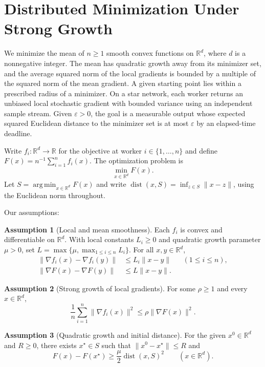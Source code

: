 \documentclass[10pt]{article}
\theoremstyle{definition}
\newtheorem{assumption}{Assumption}
\begin{document}
\section*{Distributed Minimization Under Strong Growth}
We minimize the mean of $n\geq 1$ smooth convex functions on $\mathbb{R}^d$, where $d$ is a nonnegative integer. The mean has quadratic growth away from its minimizer set, and the average squared norm of the local gradients is bounded by a multiple of the squared norm of the mean gradient. A given starting point lies within a prescribed radius of a minimizer. On a star network, each worker returns an unbiased local stochastic gradient with bounded variance using an independent sample stream. Given $\varepsilon>0$, the goal is a measurable output whose expected squared Euclidean distance to the minimizer set is at most $\varepsilon$ by an elapsed-time deadline.

Write $f_i:\mathbb{R}^d\to\mathbb{R}$ for the objective at worker $i\in\{1,\ldots,n\}$ and define $F(x)=n^{-1}\sum_{i=1}^n f_i(x)$. The optimization problem is
\[
\min_{x\in\mathbb{R}^d} F(x).
\]
Let $S=\operatorname*{arg\,min}_{x\in\mathbb{R}^d}F(x)$ and write $\operatorname{dist}(x,S)=\inf_{z\in S}\|x-z\|$, using the Euclidean norm throughout.

Our assumptions:
\begin{assumption}[Local and mean smoothness]
Each $f_i$ is convex and differentiable on $\mathbb{R}^d$. With local constants $L_i\geq 0$ and quadratic growth parameter $\mu>0$, set $L=\max\{\mu,\max_{1\leq i\leq n}L_i\}$. For all $x,y\in\mathbb{R}^d$,
\[
\begin{aligned}
\|\nabla f_i(x)-\nabla f_i(y)\| &\leq L_i\|x-y\| &&(1\leq i\leq n),\\
\|\nabla F(x)-\nabla F(y)\| &\leq L\|x-y\|.
\end{aligned}
\]
\end{assumption}

\begin{assumption}[Strong growth of local gradients]
For some $\rho\geq 1$ and every $x\in\mathbb{R}^d$,
\[
\frac{1}{n}\sum_{i=1}^n\|\nabla f_i(x)\|^2\leq \rho\|\nabla F(x)\|^2.
\]
\end{assumption}

\begin{assumption}[Quadratic growth and initial distance]
For the given $x^0\in\mathbb{R}^d$ and $R\geq 0$, there exists $x^\star\in S$ such that $\|x^0-x^\star\|\leq R$ and
\[
F(x)-F(x^\star)\geq \frac{\mu}{2}\operatorname{dist}(x,S)^2
\qquad (x\in\mathbb{R}^d).
\]
\end{assumption}
\end{document}
